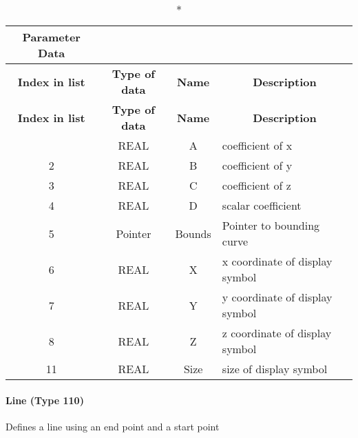 \begin{longtable}[H]{|c|c|c|l|}
  \caption*{Parameter Data} \\

  \hline
  \multicolumn{1}{|c|}{\textbf{Index in list}} & \multicolumn{1}{|c|}{\textbf{Type of data}} &
  \multicolumn{1}{|c|}{\textbf{Name}} & \multicolumn{1}{|c|}{\textbf{Description}} \\ \hline
  \endfirsthead
  \hline
  \multicolumn{1}{|c|}{\textbf{Index in list}} & \multicolumn{1}{|c|}{\textbf{Type of data}} &
  \multicolumn{1}{|c|}{\textbf{Name}} & \multicolumn{1}{|c|}{\textbf{Description}} \\ \hline
  \endhead
  
  \endfoot

  \endlastfoot
1 & REAL & A & coefficient of x\\ \hline
2 & REAL & B & coefficient of y\\ \hline
3 & REAL & C & coefficient of z\\ \hline
4 & REAL & D & scalar coefficient\\ \hline
5 & Pointer & Bounds & Pointer to bounding curve\\ \hline
6 & REAL & X & x coordinate of display symbol\\ \hline
7 & REAL & Y & y coordinate of display symbol\\ \hline
8 & REAL & Z & z coordinate of display symbol\\ \hline
11 & REAL & Size & size of display symbol\\ \hline
\end{longtable}


\paragraph{Line (Type 110)}\label{line-type-110}

Defines a line using an end point and a start point

